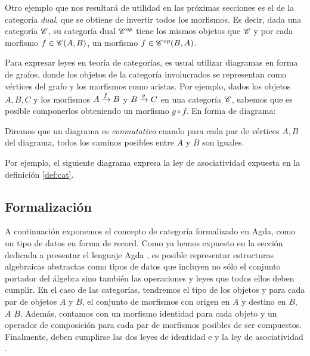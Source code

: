 \begin{example} \label{ex:op}
Otro ejemplo que nos resultará de utilidad en las próximas secciones es el de la categoría {\it dual}, que se obtiene de invertir todos los morfismos. Es decir, dada una categoría $\C$, su categoría dual $\C^{op}$ tiene los mismos objetos que $\C$ y por cada morfismo $f \in \Hom{A}{B}{\C}$, un morfismo $f \in \Hom{B}{A}{\C^{op}}$.
\end{example}

\hspace{1ex}
Para expresar leyes en teoría de categorías, es usual utilizar diagramas en forma de grafos, donde los objetos de la categoría involucrados se representan como vértices del grafo y los morfismos como aristas. Por ejemplo, dados los objetos $A,B,C$ y los morfismos $\flecha{A}{f}{B}$ y $\flecha{B}{g}{C}$ en una categoría $\C$, sabemos que es posible componerlos obteniendo un morfismo $g \circ f$. En forma de diagrama:

  \begin{center}
  \xymatrixcolsep{3pc} \xymatrixrowsep{3pc}
  \centerline{}
  \end{center}

  Diremos que un diagrama es {\it conmutativo} cuando para cada par de vértices $A, B$ del diagrama, todos los caminos posibles entre $A$ y $B$ son iguales.

  Por ejemplo, el siguiente diagrama expresa la ley de asociatividad expuesta en la definición \ref{def:cat}.

  \begin{center}
  \xymatrixcolsep{3pc} \xymatrixrowsep{3pc}
  \centerline{}
  \end{center}

\subsection{Formalización}
A continuación exponemos el concepto de categoría formalizado en Agda, como un tipo de datos en forma de record.  
Como ya hemos expuesto en la sección dedicada a presentar el lenguaje Agda%
, es posible representar estructuras algebraicas abstractas como tipos de datos que incluyen no sólo el conjunto portador del álgebra sino también las operaciones y leyes que todos ellos deben cumplir. En el caso de las categorías, tendremos el tipo de los objetos  y para cada par de objetos $A$ y $B$, el conjunto de morfismos con origen en $A$ y destino en $B$,  $A$ $B$. Además, contamos con un morfismo identidad  para cada objeto y un operador de composición para cada par de morfismos posibles de ser compuestos. Finalmente, deben cumplirse las dos leyes de identidad  e  y la ley de asociatividad .


